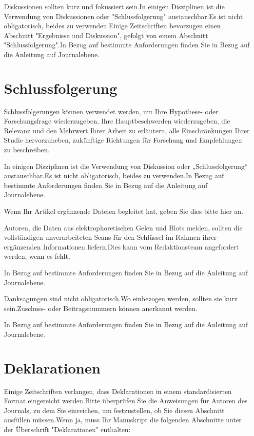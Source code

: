 \documentclass[pdflatex,sn-mathphys-num]{sn-jnl}%
\theoremstyle{thmstyleone}%
\theoremstyle{thmstyletwo}%
\theoremstyle{thmstylethree}%
\begin{document}
Diskussionen sollten kurz und fokussiert sein.In einigen Disziplinen ist die Verwendung von Diskussionen oder "Schlussfolgerung" austauschbar.Es ist nicht obligatorisch, beides zu verwenden.Einige Zeitschriften bevorzugen einen Abschnitt "Ergebnisse und Diskussion", gefolgt von einem Abschnitt "Schlussfolgerung".In Bezug auf bestimmte Anforderungen finden Sie in Bezug auf die Anleitung auf Journalebene.

\section{Schlussfolgerung} \label{sec13}

Schlussfolgerungen können verwendet werden, um Ihre Hypothese- oder Forschungsfrage wiederzugeben, Ihre Hauptbeschwerden wiederzugeben, die Relevanz und den Mehrwert Ihrer Arbeit zu erläutern, alle Einschränkungen Ihrer Studie hervorzuheben, zukünftige Richtungen für Forschung und Empfehlungen zu beschreiben.

In einigen Disziplinen ist die Verwendung von Diskussion oder „Schlussfolgerung“ austauschbar.Es ist nicht obligatorisch, beides zu verwenden.In Bezug auf bestimmte Anforderungen finden Sie in Bezug auf die Anleitung auf Journalebene.

\backmatter


Wenn Ihr Artikel ergänzende Dateien begleitet hat, geben Sie dies bitte hier an.

Autoren, die Daten aus elektrophoretischen Gelen und Blots melden, sollten die vollständigen unverarbeiteten Scans für den Schlüssel im Rahmen ihrer ergänzenden Informationen liefern.Dies kann vom Redaktionsteam angefordert werden, wenn es fehlt.

In Bezug auf bestimmte Anforderungen finden Sie in Bezug auf die Anleitung auf Journalebene.


Danksagungen sind nicht obligatorisch.Wo einbezogen werden, sollten sie kurz sein.Zuschuss- oder Beitragsnummern können anerkannt werden.

In Bezug auf bestimmte Anforderungen finden Sie in Bezug auf die Anleitung auf Journalebene.

\section*{Deklarationen}

Einige Zeitschriften verlangen, dass Deklarationen in einem standardisierten Format eingereicht werden.Bitte überprüfen Sie die Anweisungen für Autoren des Journals, zu dem Sie einreichen, um festzustellen, ob Sie diesen Abschnitt ausfüllen müssen.Wenn ja, muss Ihr Manuskript die folgenden Abschnitte unter der Überschrift "Deklarationen" enthalten:
\end{document}
